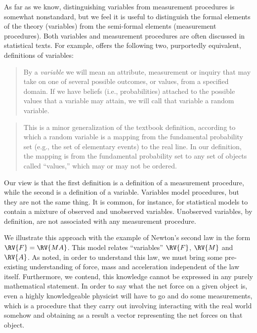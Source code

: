 As far as we know, distinguishing variables from measurement procedures is somewhat nonstandard, but we feel it is useful to distinguish the formal elements of the theory (variables) from the semi-formal elements (measurement procedures). Both variables and measurement procedures are often discussed in statistical texts. For example, \citet{pearl_causality:_2009} offers the following two, purportedly equivalent, definitions of variables:
\begin{quote}
By a \emph{variable} we will mean an attribute, measurement or inquiry that may take on one of several possible outcomes, or values, from a specified domain. If we have beliefs (i.e., probabilities) attached to the possible values that a variable may attain, we will call that variable a random variable.
\end{quote}

\begin{quote}
This is a minor generalization of the textbook definition, according to which a random variable is a mapping from the fundamental probability set (e.g., the set of elementary events) to the real line. In our definition, the mapping is from the fundamental probability set to any set of objects called ``values,'' which may or may not be ordered.
\end{quote}

Our view is that the first definition is a definition of a measurement procedure, while the second is a definition of a variable. Variables model procedures, but they are not the same thing. It is common, for instance, for statistical models to contain a mixture of observed and unobserved variables. Unobserved variables, by definition, are not associated with any measurement procedure.


We illustrate this approach with the example of Newton's second law in the form $\RV{F}=\RV{MA}$. This model relates ``variables'' $\RV{F}$, $\RV{M}$ and $\RV{A}$. As \citet{feynman_feynman_1979} noted, in order to understand this law, we must bring some pre-existing understanding of force, mass and acceleration independent of the law itself. Furthermore, we contend, this knowledge cannot be expressed in any purely mathematical statement. In order to say what the net force on a given object is, even a highly knowledgeable physicist will have to go and do some measurements, which is a procedure that they carry out involving interacting with the real world somehow and obtaining as a result a vector representing the net forces on that object.

